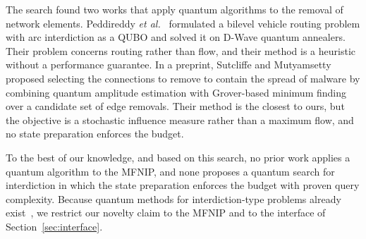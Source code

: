 The search found two works that apply quantum algorithms to the removal of network elements. Peddireddy \emph{et al.}~\cite{peddireddy2026} formulated a bilevel vehicle routing problem with arc interdiction as a QUBO and solved it on D-Wave quantum annealers. Their problem concerns routing rather than flow, and their method is a heuristic without a performance guarantee. In a preprint, Sutcliffe and Mutyamsetty~\cite{sutcliffe2026} proposed selecting the connections to remove to contain the spread of malware by combining quantum amplitude estimation with Grover-based minimum finding over a candidate set of edge removals. Their method is the closest to ours, but the objective is a stochastic influence measure rather than a maximum flow, and no state preparation enforces the budget.

To the best of our knowledge, and based on this search, no prior work applies a quantum algorithm to the MFNIP, and none proposes a quantum search for interdiction in which the state preparation enforces the budget with proven query complexity. Because quantum methods for interdiction-type problems already exist~\cite{peddireddy2026,sutcliffe2026}, we restrict our novelty claim to the MFNIP and to the interface of Section~\ref{sec:interface}.
